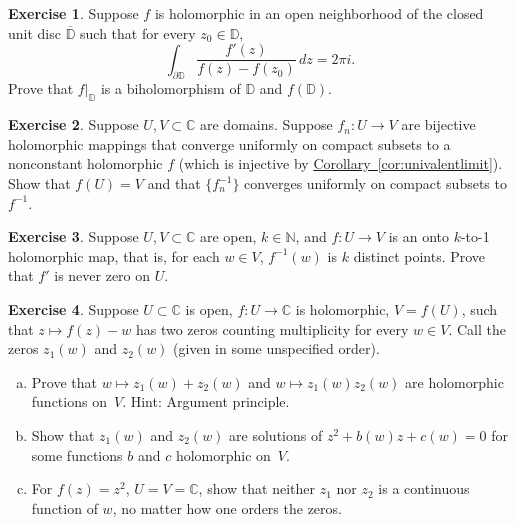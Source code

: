 \documentclass[12pt,openany]{book}
\newcommand{\C}{{\mathbb{C}}}
\newcommand{\N}{{\mathbb{N}}}
\newcommand{\D}{{\mathbb{D}}}
\theoremstyle{plain}
\theoremstyle{remark}
\theoremstyle{definition}
\newenvironment{exbox}{%
    \def\FrameCommand{\vrule width 1pt \relax\hspace{10pt}}%
    \MakeFramed{\advance\hsize-\width\FrameRestore}%
}{%
    \endMakeFramed
}
\newenvironment{exparts}{%
    \leavevmode\begin{enumerate}[a),noitemsep,topsep=0pt,parsep=0pt,partopsep=0pt]
}{%
    \end{enumerate}
}
\theoremstyle{exercise}
\newtheorem{exercise}{Exercise}[section]
\theoremstyle{example}
\newcommand{\corref}[1]{\hyperref[#1]{Corollary~\ref*{#1}}}
\begin{document}
\begin{exbox}
\begin{exercise}
Suppose $f$ is holomorphic in an open neighborhood of the closed unit disc
$\overline{\D}$ such that for every $z_0 \in \D$,
\begin{equation*}
\int_{\partial \D}
\frac{f'(z)}{f(z)-f(z_0)}
\, dz = 2\pi i .
\end{equation*}
Prove that $f|_{\D}$ is a biholomorphism of $\D$ and $f(\D)$.
\end{exercise}

\begin{exercise}
Suppose $U,V \subset \C$ are domains.
Suppose $f_n \colon U \to V$ are bijective holomorphic mappings
that converge uniformly on compact subsets to a nonconstant
holomorphic $f$ (which is injective by \corref{cor:univalentlimit}).
Show that $f(U) = V$ and that $\bigl\{ f_n^{-1} \bigr\}$ converges uniformly on
compact subsets to $f^{-1}$.
\end{exercise}

\begin{exercise} \label{exercise:ktoone}
Suppose $U,V \subset \C$ are open, $k \in \N$, and $f \colon U \to V$ is an
onto $k$-to-1
holomorphic map, that is, for each $w \in V$, $f^{-1}(w)$ is $k$ distinct
points.  Prove that $f'$ is never zero on $U$.
\end{exercise}

\begin{exercise}
Suppose $U \subset \C$ is open, $f \colon U \to \C$ is
holomorphic, $V = f(U)$, such that $z \mapsto f(z)-w$
has two zeros counting multiplicity for every $w \in V$.
Call the zeros
$z_1(w)$ and $z_2(w)$ (given in some unspecified order).
\begin{exparts}
\item
Prove that $w \mapsto z_1(w)+z_2(w)$ and 
$w \mapsto z_1(w)z_2(w)$ are holomorphic functions on~$V$.
Hint: Argument principle.
\item
Show that $z_1(w)$ and $z_2(w)$ are solutions of
$z^2 + b(w) z + c(w) = 0$ for some functions $b$ and $c$ holomorphic on~$V$.
\item
For $f(z) = z^2$, $U = V = \C$, show that neither $z_1$ nor $z_2$ is a continuous
function of $w$,
no matter how one orders the zeros.
\end{exparts}
\end{exercise}
\end{exbox}


\end{document}
